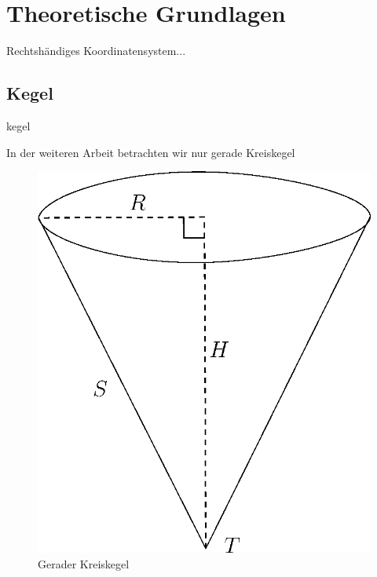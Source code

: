 \chapter{Theoretische Grundlagen}
\label{ch:theory}

Rechtshändiges Koordinatensystem...

\section{Kegel}
\label{s:cone}

\begin{definition}[Kegel]
	kegel
\end{definition}

In der weiteren Arbeit betrachten wir nur gerade Kreiskegel

\begin{figure}[!htb]
	\centering
	\includegraphics[scale=.5]{images/fullCone.eps}
	\caption{Gerader Kreiskegel}
	\label{fig:cone}
\end{figure}

